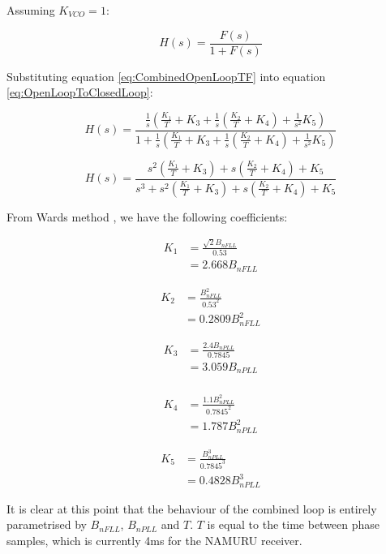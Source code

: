 Assuming $K_{VCO}=1$:

\begin{equation}
 H(s) = \frac{F(s)}{1+F(s)}
\label{eq:OpenLoopToClosedLoop}
\end{equation}

Substituting equation \ref{eq:CombinedOpenLoopTF} into equation \ref{eq:OpenLoopToClosedLoop}:

\begin{equation}
 H(s) = \frac{\frac{1}{s} (\frac{K_1}{T}+K_3 + \frac{1}{s}(\frac{K_2}{T}+K_4) + \frac{1}{s^2} K_5)}{1+\frac{1}{s} (\frac{K_1}{T}+K_3 + \frac{1}{s}(\frac{K_2}{T}+K_4) + \frac{1}{s^2} K_5)}
\end{equation}

\begin{equation}
 H(s) = \frac{s^2(\frac{K_1}{T}+K_3) + s(\frac{K_2}{T}+K_4) + K_5}
 {s^3+ s^2(\frac{K_1}{T}+K_3)+ s(\frac{K_2}{T}+K_4) + K_5}
\end{equation}
\clearpage


From Wards method \cite{Ward}, we have the following coefficients:

\begin{align*}
K_1 &=\frac{\sqrt{2}B_{nFLL}}{0.53}\\
    &= 2.668 B_{nFLL}
\end{align*}

\begin{align*}
K_2 &=\frac{B_{nFLL}^2}{0.53^2}\\
    &= 0.2809 B_{nFLL}^2
\end{align*}

\begin{align*}
K_3 &=\frac{2.4B_{nPLL}}{0.7845}\\ 
    &=3.059 B_{nPLL}\\
\end{align*}

\begin{align*}
K_4 &=\frac{1.1B_{nPLL}^2}{0.7845^2}\\
    &=1.787 B_{nPLL}^2
\end{align*}

\begin{align*}
K_5 &=\frac{B_{nPLL}^3}{0.7845^3}\\
    &=0.4828B_{nPLL}^3
\end{align*}

It is clear at this point that the behaviour of the combined loop is entirely parametrised by $B_{nFLL}$,  $B_{nPLL}$ and $T$. $T$ is equal to the time between phase samples, which is currently 4ms for the \ac{NAMURU} receiver.

